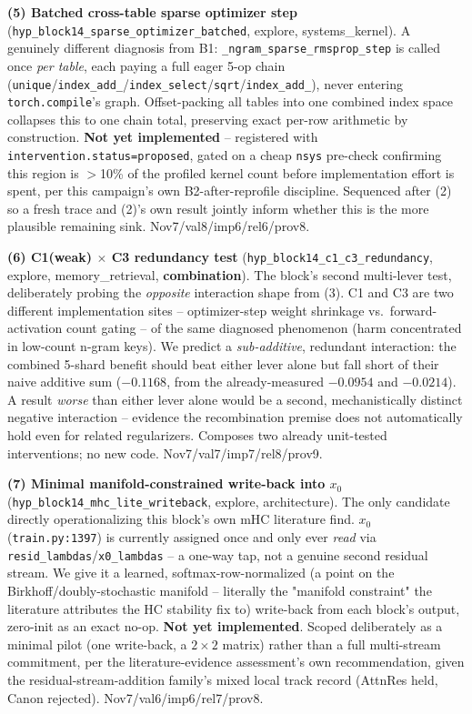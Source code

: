 \documentclass{article}
\begin{document}
\textbf{(5) Batched cross-table sparse optimizer step} (\texttt{hyp\_block14\_sparse\_optimizer\_batched}, explore, systems\_kernel). A genuinely different diagnosis from B1: \texttt{\_ngram\_sparse\_rmsprop\_step} is called once \emph{per table}, each paying a full eager 5-op chain (\texttt{unique}/\texttt{index\_add\_}/\texttt{index\_select}/\texttt{sqrt}/\texttt{index\_add\_}), never entering \texttt{torch.compile}'s graph. Offset-packing all tables into one combined index space collapses this to one chain total, preserving exact per-row arithmetic by construction. \textbf{Not yet implemented} -- registered with \texttt{intervention.status=proposed}, gated on a cheap \texttt{nsys} pre-check confirming this region is $>$10\% of the profiled kernel count before implementation effort is spent, per this campaign's own B2-after-reprofile discipline. Sequenced after (2) so a fresh trace and (2)'s own result jointly inform whether this is the more plausible remaining sink. Nov7/val8/imp6/rel6/prov8.

\textbf{(6) C1(weak) $\times$ C3 redundancy test} (\texttt{hyp\_block14\_c1\_c3\_redundancy}, explore, memory\_retrieval, \textbf{combination}). The block's second multi-lever test, deliberately probing the \emph{opposite} interaction shape from (3). C1 and C3 are two different implementation sites -- optimizer-step weight shrinkage vs.\ forward-activation count gating -- of the same diagnosed phenomenon (harm concentrated in low-count n-gram keys). We predict a \emph{sub-additive}, redundant interaction: the combined 5-shard benefit should beat either lever alone but fall short of their naive additive sum ($-0.1168$, from the already-measured $-0.0954$ and $-0.0214$). A result \emph{worse} than either lever alone would be a second, mechanistically distinct negative interaction -- evidence the recombination premise does not automatically hold even for related regularizers. Composes two already unit-tested interventions; no new code. Nov7/val7/imp7/rel8/prov9.

\textbf{(7) Minimal manifold-constrained write-back into $x_0$} (\texttt{hyp\_block14\_mhc\_lite\_writeback}, explore, architecture). The only candidate directly operationalizing this block's own mHC literature find. $x_0$ (\texttt{train.py:1397}) is currently assigned once and only ever \emph{read} via \texttt{resid\_lambdas}/\texttt{x0\_lambdas} -- a one-way tap, not a genuine second residual stream. We give it a learned, softmax-row-normalized (a point on the Birkhoff/doubly-stochastic manifold -- literally the "manifold constraint" the literature attributes the HC stability fix to) write-back from each block's output, zero-init as an exact no-op. \textbf{Not yet implemented}. Scoped deliberately as a minimal pilot (one write-back, a $2\times2$ matrix) rather than a full multi-stream commitment, per the literature-evidence assessment's own recommendation, given the residual-stream-addition family's mixed local track record (AttnRes held, Canon rejected). Nov7/val6/imp6/rel7/prov8.
\end{document}
